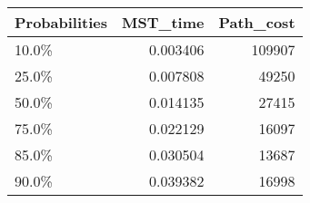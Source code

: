 \begin{tabular}{lrr}
\toprule
Probabilities &  MST\_time &  Path\_cost \\
\midrule
        10.0\% &  0.003406 &     109907 \\
        25.0\% &  0.007808 &      49250 \\
        50.0\% &  0.014135 &      27415 \\
        75.0\% &  0.022129 &      16097 \\
        85.0\% &  0.030504 &      13687 \\
        90.0\% &  0.039382 &      16998 \\
\bottomrule
\end{tabular}
